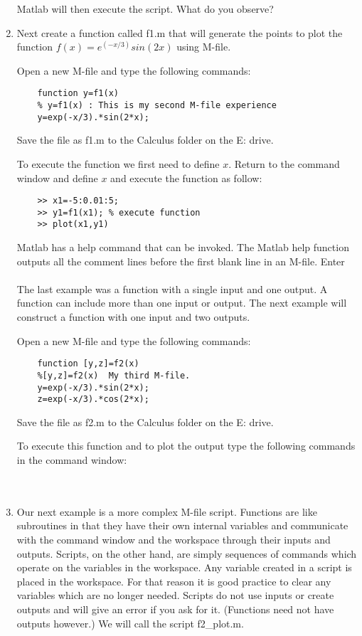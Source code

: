 \begin{enumerate}
  Matlab will then execute the script.  What do you observe?
  
  \item Next create a function called f1.m that will generate the points to plot
  the function $f(x)=e^{(-x/3)}sin(2x)$ using M-file.
  
  Open a new M-file and type the following commands:
  \begin{verbatim}
    function y=f1(x)
    % y=f1(x) : This is my second M-file experience
    y=exp(-x/3).*sin(2*x);
  \end{verbatim}
  Save the file as f1.m to the Calculus folder on the E: drive.
  
  To execute the function we first need to define $x$.  Return to the command
  window and define $x$  and execute the function as follow:\\
  \begin{verbatim}
    >> x1=-5:0.01:5;
    >> y1=f1(x1); % execute function
    >> plot(x1,y1)
  \end{verbatim}
  
  Matlab has a help command that can be invoked.  The Matlab help function outputs
  all the comment lines before the first blank line in an M-file.  Enter\\
  \\
  The last example was a function with a single input and one output.  A function
  can include more than one input or output.  The next example will construct a
  function with one input and two outputs.
  
  Open a new M-file and type the following commands:
  \begin{verbatim}
    function [y,z]=f2(x)
    %[y,z]=f2(x)  My third M-file.
    y=exp(-x/3).*sin(2*x);
    z=exp(-x/3).*cos(2*x);
  \end{verbatim}
  Save the file as f2.m to the Calculus folder on the E: drive.
  
  To execute this function and to plot the output type the following commands in 
  the command window:\\
  \\
  \\
  
  \item Our next example is a more complex M-file script.  Functions are like
  subroutines in that they have their own internal variables and communicate
  with the command window and the workspace through their inputs and outputs. 
  Scripts, on the other hand, are simply sequences of commands which operate on
  the variables in the workspace.  Any variable created in a script is placed in
  the workspace.  For that reason it is good practice to clear any variables
  which are no longer needed.  Scripts do not use inputs or create outputs and
  will give an error if you ask for it.  (Functions need not have outputs
  however.)  We will call the script f2\_plot.m.
  

\end{enumerate}
